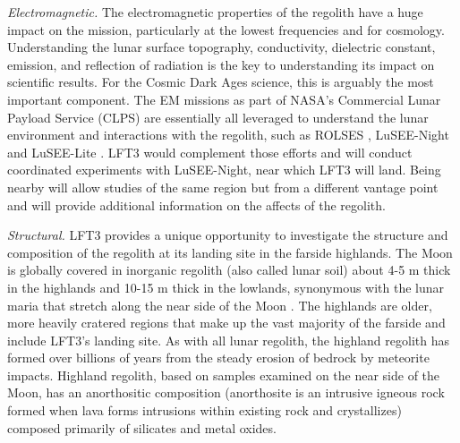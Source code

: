 {\em Electromagnetic.}  The electromagnetic properties of the regolith have a huge impact on the mission, particularly at the lowest frequencies and for cosmology.  Understanding the lunar surface topography, conductivity, dielectric constant, emission, and reflection of radiation is the key to understanding its impact on scientific results.  For the Cosmic Dark Ages science, this is arguably the most important component.  The EM missions as part of NASA's Commercial Lunar Payload Service (CLPS) are essentially all leveraged to understand the lunar environment and interactions with the regolith, such as ROLSES \citep{2025arXiv250309842H}, LuSEE-Night \citep{2023URSIGASSLuSEENight, 2023arXiv230110345B} and LuSEE-Lite \citep{2023AGUFM.P31B..02B}.  LFT3 would complement those efforts and will conduct coordinated experiments with LuSEE-Night, near which LFT3 will land.  Being nearby will allow studies of the same region but from a different vantage point and will provide additional information on the affects of the regolith.

{\em Structural.} LFT3 provides a unique opportunity to investigate the structure and composition of the regolith at its landing site in the farside highlands.  The Moon is globally covered in inorganic regolith (also called lunar soil) about 4-5 m thick in the highlands and 10-15 m thick in the lowlands, synonymous with the lunar maria that stretch along the near side of the Moon \citep{mckay1991lunar}. The highlands are older, more heavily cratered regions that make up the vast majority of the farside and include LFT3's landing site.  As with all lunar regolith, the highland regolith has formed over billions of years from the steady erosion of bedrock by meteorite impacts. Highland regolith, based on samples examined on the near side of the Moon, has an anorthositic composition (anorthosite is an intrusive igneous rock formed when lava forms intrusions within existing rock and crystallizes) composed primarily of silicates and metal oxides.

